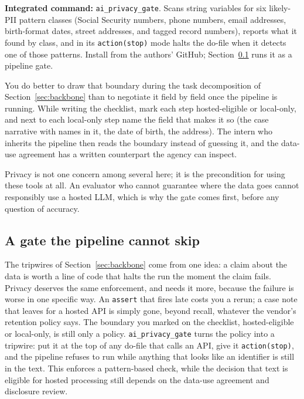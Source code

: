 \documentclass[
    a4paper,
    fontsize=10pt,
    twoside=true,
    numbers=noenddot,
]{kaobook}
\begin{document}
\begin{kaobox}[frametitle=Package Integration: \texttt{ai\_privacy\_gate}]
\textbf{Integrated command:} \texttt{ai\_privacy\_gate}. Scans string variables for six likely-PII pattern classes (Social Security numbers, phone numbers, email addresses, birth-format dates, street addresses, and tagged record numbers), reports what it found by class, and in its \texttt{action(stop)} mode halts the do-file when it detects one of those patterns. Install from the authors' GitHub; Section~\ref{sec:ch13-aigate} runs it as a pipeline gate.
\end{kaobox}

You do better to draw that boundary during the task decomposition of Section~\ref{sec:backbone} than to negotiate it field by field once the pipeline is running. While writing the checklist, mark each step hosted-eligible or local-only, and next to each local-only step name the field that makes it so (the case narrative with names in it, the date of birth, the address). The intern who inherits the pipeline then reads the boundary instead of guessing it, and the data-use agreement has a written counterpart the agency can inspect.

Privacy is not one concern among several here; it is the precondition for using these tools at all. An evaluator who cannot guarantee where the data goes cannot responsibly use a hosted LLM, which is why the gate comes first, before any question of accuracy.

\subsection{A gate the pipeline cannot skip}\label{sec:ch13-aigate}
The tripwires of Section~\ref{sec:backbone} come from one idea: a claim about the data is worth a line of code that halts the run the moment the claim fails. Privacy deserves the same enforcement, and needs it more, because the failure is worse in one specific way. An \texttt{assert} that fires late costs you a rerun; a case note that leaves for a hosted API is simply gone, beyond recall, whatever the vendor's retention policy says. The boundary you marked on the checklist, hosted-eligible or local-only, is still only a policy. \texttt{ai\_privacy\_gate} turns the policy into a tripwire: put it at the top of any do-file that calls an API, give it \texttt{action(stop)}, and the pipeline refuses to run while anything that looks like an identifier is still in the text. This enforces a pattern-based check, while the decision that text is eligible for hosted processing still depends on the data-use agreement and disclosure review.
\end{document}
